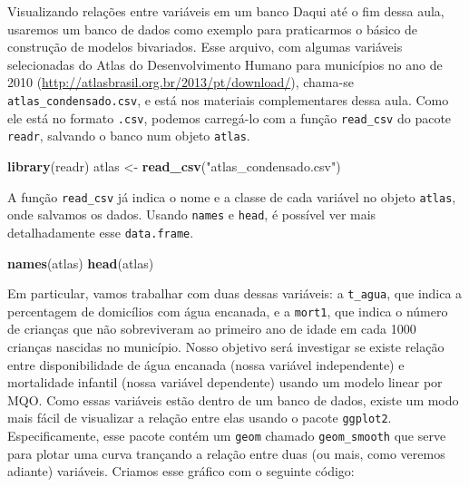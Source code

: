 \documentclass[
  9pt,
  ignorenonframetext,
  aspectratio=169]{beamer}
\newenvironment{Shaded}{\begin{snugshade}}{\end{snugshade}}
\newcommand{\KeywordTok}[1]{\textcolor[rgb]{0.13,0.29,0.53}{\textbf{#1}}}
\newcommand{\NormalTok}[1]{#1}
\newcommand{\StringTok}[1]{\textcolor[rgb]{0.31,0.60,0.02}{#1}}
\begin{document}
\begin{frame}[fragile]{Visualizando relações entre variáveis em um
banco}
\protect\hypertarget{visualizando-relauxe7uxf5es-entre-variuxe1veis-em-um-banco}{}
Daqui até o fim dessa aula, usaremos um banco de dados como exemplo para
praticarmos o básico de construção de modelos bivariados. Esse arquivo,
com algumas variáveis selecionadas do Atlas do Desenvolvimento Humano
para municípios no ano de 2010
(\url{http://atlasbrasil.org.br/2013/pt/download/}), chama-se
\texttt{atlas\_condensado.csv}, e está nos materiais complementares
dessa aula. Como ele está no formato \texttt{.csv}, podemos carregá-lo
com a função \texttt{read\_csv} do pacote \texttt{readr}, salvando o
banco num objeto \texttt{atlas}.

\begin{Shaded}
\begin{Highlighting}[]
\KeywordTok{library}\NormalTok{(readr)}
\NormalTok{atlas \textless{}{-}}\StringTok{ }\KeywordTok{read\_csv}\NormalTok{(}\StringTok{"atlas\_condensado.csv"}\NormalTok{)}
\end{Highlighting}
\end{Shaded}

A função \texttt{read\_csv} já indica o nome e a classe de cada variável
no objeto \texttt{atlas}, onde salvamos os dados. Usando \texttt{names}
e \texttt{head}, é possível ver mais detalhadamente esse
\texttt{data.frame}.

\begin{Shaded}
\begin{Highlighting}[]
\KeywordTok{names}\NormalTok{(atlas)}
\KeywordTok{head}\NormalTok{(atlas)}
\end{Highlighting}
\end{Shaded}

Em particular, vamos trabalhar com duas dessas variáveis: a
\texttt{t\_agua}, que indica a percentagem de domicílios com água
encanada, e a \texttt{mort1}, que indica o número de crianças que não
sobreviveram ao primeiro ano de idade em cada 1000 crianças nascidas no
município. Nosso objetivo será investigar se existe relação entre
disponibilidade de água encanada (nossa variável independente) e
mortalidade infantil (nossa variável dependente) usando um modelo linear
por MQO. Como essas variáveis estão dentro de um banco de dados, existe
um modo mais fácil de visualizar a relação entre elas usando o pacote
\texttt{ggplot2}. Especificamente, esse pacote contém um \texttt{geom}
chamado \texttt{geom\_smooth} que serve para plotar uma curva trançando
a relação entre duas (ou mais, como veremos adiante) variáveis. Criamos
esse gráfico com o seguinte código:


\end{frame}
\end{document}
